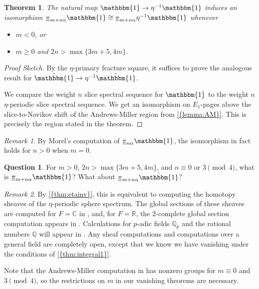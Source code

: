 \documentclass[10pt]{amsart}
\numberwithin{equation}{section}
\theoremstyle{plain}
\newtheorem{theorem}[theorem]{Theorem}
\theoremstyle{definition}
\newtheorem{question}[question]{Question}
\theoremstyle{remark}
\newtheorem{remark}[remark]{Remark}
\begin{document}
\begin{theorem}\label{thm:etainv}
The natural map ${\mathbbm{1}}\to\eta^{-1}{\mathbbm{1}}$ induces an isomorphism ${\underline{\smash{\pi}}}_{m+n\alpha}{\mathbbm{1}}\cong{\underline{\smash{\pi}}}_{m+n\alpha}\eta^{-1}{\mathbbm{1}}$ whenever
\begin{itemize}
\item $m<0$, or
\item $m\ge 0$ and $2n>\max\{3m+5,4m\}$.
\end{itemize}
\end{theorem}
\begin{proof}[Proof Sketch]
By the $\eta$-primary fracture square, it suffices to prove the analogous result for $\hat{\mathbbm{1}}\to\eta^{-1}\hat{\mathbbm{1}}$.  

We compare the weight $n$ slice spectral sequence for ${\mathbbm{1}}$ to the  weight $n$ $\eta$-periodic slice spectral sequence.  We get an isomorphism on $E_1$-pages above the slice-to-Novikov shift of the Andrews-Miller region from {\autoref{{lemma:AM}}}.  This is precisely the region stated in the theorem.
\end{proof}

\begin{remark}
By Morel's computation of ${\underline{\smash{\pi}}}_{n\alpha}{\mathbbm{1}}$, the isomorphism in fact holds for $n>0$ when $m=0$.
\end{remark}

\begin{question}
For $m>0$, $2n>\max\{3m+5,4m\}$, and $n\equiv 0$ or $3\pmod 4$, what is ${\underline{\smash{\pi}}}_{m+n\alpha}{\mathbbm{1}}$?  What about ${\underline{\smash{\pi}}}_{m+n\alpha}\hat{\mathbbm{1}}$?
\end{question}
\begin{remark}
By {\autoref{{thm:etainv}}}, this is equivalent to computing the homotopy sheaves of the $\eta$-periodic sphere spectrum.  
The global sections of these sheaves are computed for $F = {\mathbb{C}}$ in \cite{AM}, and, for $F={\mathbb{R}}$, the $2$-complete global section computation appears in \cite{GI:etaR}.  
Calculations for $p$-adic fields ${\mathbb{Q}}_{p}$ and the rational numbers ${\mathbb{Q}}$ will appear in \cite{Wilson}.
Any sheaf computations and computations over a general field are completely open, except that we know we have vanishing under the conditions of {\autoref{{thm:integral1}}}.

Note that the Andrews-Miller computation in \cite{AM} has nonzero groups for $m\equiv 0$ and $3\pmod{4}$, so the restrictions on $m$ in our vanishing theorems are necessary.
\end{remark}
\end{document}
